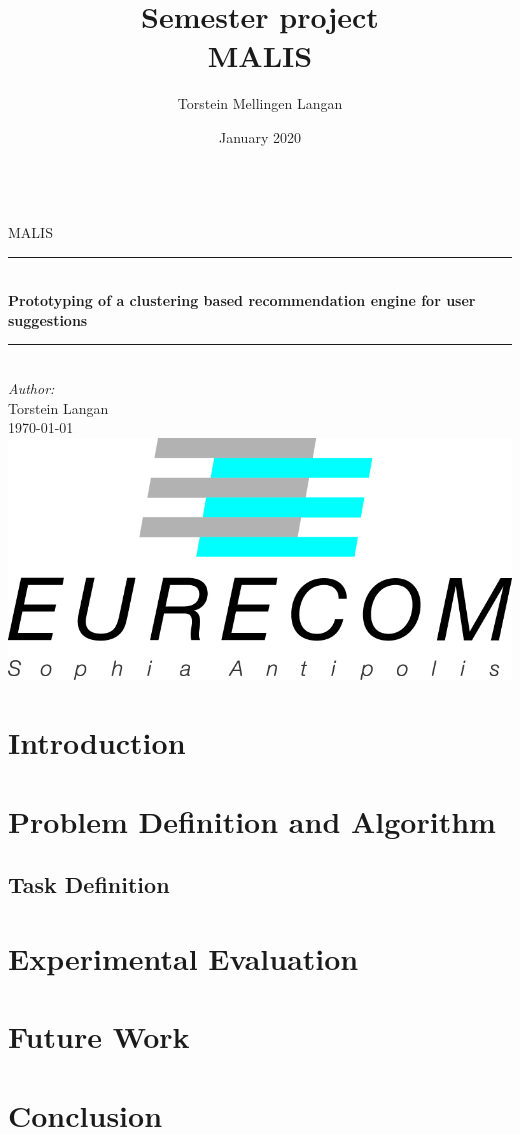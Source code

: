\documentclass{article}
\title{Semester project\\MALIS}
\author{Torstein Mellingen Langan}
\date{January 2020}
\begin{document}

\begin{titlepage}
\newcommand{\HRule}{\rule{\linewidth}{0.5mm}}
\center
\textsc{\LARGE}\\[1.5cm]
\textsc{\Large MALIS}\\[0.5cm]
\HRule \\[0.4cm]
{ \huge \bfseries Prototyping of a clustering based recommendation engine for user suggestions}\\[0.4cm]
\HRule \\[1.5cm]
\emph{Author:}\\
Torstein Langan\\[2cm]
{\large \today}\\[2cm]
\includegraphics[scale=0.2]{illustrations/logos/EURECOM_logo.jpg}\\[1cm]
\vfill
\end{titlepage}



\newpage{}
\tableofcontents
\newpage{}

\section{Introduction}
\label{sec:introduction}


\section{Problem Definition and Algorithm}
\subsection{Task Definition}

\section{Experimental Evaluation}

\section{Future Work}

\section{Conclusion}


{}

\end{document}
